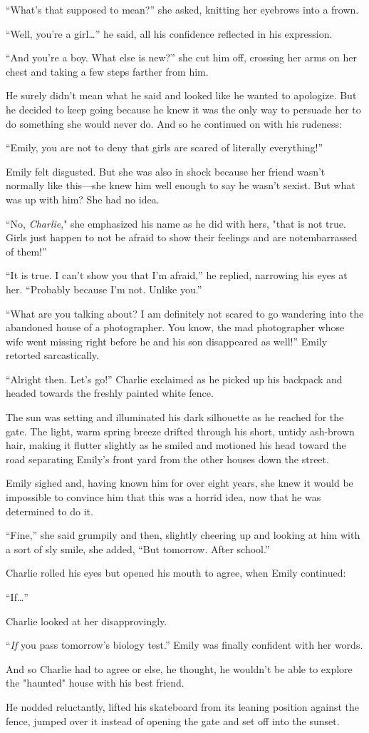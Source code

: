 “What's that supposed to mean?” she asked, knitting her eyebrows into a frown.

“Well, you're a girl…” he said, all his confidence reflected in his expression.

“And you're a boy. What else is new?” she cut him off, crossing her arms on her chest and taking a few steps farther from him.

He surely didn't mean what he said and looked like he wanted to apologize. But he decided to keep going because he knew it was the only way to persuade her to do something she would never do. And so he continued on with his rudeness:

“Emily, you are not to deny that girls are scared of literally everything!”

Emily felt disgusted. But she was also in shock because her friend wasn't normally like this—she knew him well enough to say he wasn't sexist. But what was up with him? She had no idea.

“No, \textit{Charlie}," she emphasized his name as he did with hers, "that is not true. Girls just happen to not be afraid to show their feelings and are notembarrassed of them!”

“It is true. I can't show you that I'm afraid,” he replied, narrowing his eyes at her. “Probably because I'm not. Unlike you.”

“What are you talking about? I am definitely not scared to go wandering into the abandoned house of a photographer. You know, the mad photographer whose wife went missing right before he and his son disappeared as well!” Emily retorted sarcastically.

“Alright then. Let's go!” Charlie exclaimed as he picked up his backpack and headed towards the freshly painted white fence.

The sun was setting and illuminated his dark silhouette as he reached for the gate. The light, warm spring breeze drifted    through his short, untidy ash-brown hair, making it flutter slightly as he smiled and motioned his head toward the road separating Emily's front yard from the other houses down the street.

Emily sighed and, having known him for over eight years, she knew it would be impossible to convince him that this was a horrid idea, now that he was determined to do it.

“Fine,” she said grumpily and then, slightly cheering up and looking at him with a sort of sly smile, she added, “But tomorrow. After school.”

Charlie rolled his eyes but opened his mouth to agree, when Emily continued:

“If…”

Charlie looked at her disapprovingly.

“\textit{If} you pass tomorrow's biology test.” Emily was finally confident with her words.

And so Charlie had to agree or else, he thought, he wouldn't be able to explore the "haunted" house with his best friend.

He nodded reluctantly, lifted his skateboard from its leaning position against the fence, jumped over it instead of opening the gate and set off into the sunset.